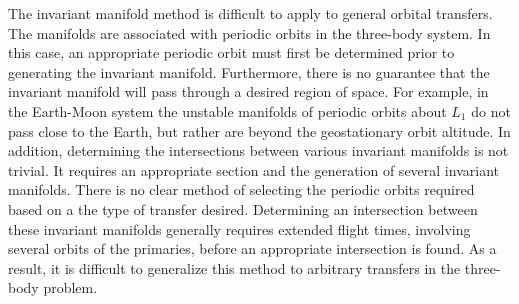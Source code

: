 \documentclass[smallcondensed]{svjour3}
\begin{document}
The invariant manifold method is difficult to apply to general orbital transfers. 
The manifolds are associated with periodic orbits in the three-body system. 
In this case, an appropriate periodic orbit must first be determined prior to generating the invariant manifold.
Furthermore, there is no guarantee that the invariant manifold will pass through a desired region of space. 
For example, in the Earth-Moon system the unstable manifolds of periodic orbits about \( L_1 \) do not pass close to the Earth, but rather are beyond the geostationary orbit altitude. 
In addition, determining the intersections between various invariant manifolds is not trivial. 
It requires an appropriate \Poincare section and the generation of several invariant manifolds.
There is no clear method of selecting the periodic orbits required based on a the type of transfer desired. 
Determining an intersection between these invariant manifolds generally requires extended flight times, involving several orbits of the primaries, before an appropriate intersection is found.
As a result, it is difficult to generalize this method to arbitrary transfers in the three-body problem.
\end{document}
